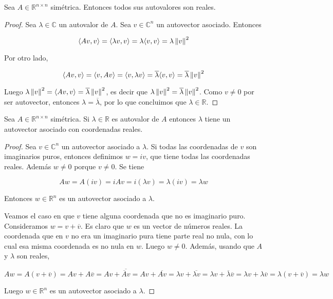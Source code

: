 \begin{lema}
\label{lema:autovreales}
Sea $A \in \mathbb{R}^{n \times n}$ simétrica. Entonces todos sus autovalores son reales.

\begin{proof}
Sea $\lambda \in \mathbb{C}$ un autovalor de $A$. Sea $v \in \mathbb{C}^n$ un autovector asociado. Entonces

\[\langle Av, v \rangle = \langle \lambda v, v \rangle = \lambda \langle v, v \rangle = \lambda \left\lVert v\right\rVert^2\]

Por otro lado,

\[\langle Av, v \rangle = \langle v, Av \rangle = \langle v, \lambda v \rangle = \overline{\lambda}\langle v, v \rangle = \overline{\lambda} \left\lVert v\right\rVert^2\]

Luego $\lambda \left\lVert v\right\rVert^2 = \langle Av, v \rangle = \overline{\lambda} \left\lVert v\right\rVert^2$, es decir que $\lambda \left\lVert v\right\rVert^2 = \overline{\lambda} \left\lVert v\right\rVert^2$. Como $v \neq 0$ por ser autovector, entonces $\lambda = \overline{\lambda}$, por lo que concluimos que $\lambda \in \mathbb{R}$.
\end{proof}
\end{lema}

\begin{lema}
Sea $A \in \mathbb{R}^{n \times n}$ simétrica. Si $\lambda \in \mathbb{R}$ es autovalor de $A$ entonces $\lambda$ tiene un autovector asociado con coordenadas reales.

\begin{proof}
Sea $v \in \mathbb{C}^n$ un autovector asociado a $\lambda$. Si todas las coordenadas de $v$ son imaginarios puros, entonces definimos $w = iv$, que tiene todas las coordenadas reales. Además $w \neq 0$ porque $v \neq 0$. Se tiene

\[Aw = A(iv) = iAv = i(\lambda v) = \lambda (iv) = \lambda w\]

Entonces $w \in \mathbb{R}^n$ es un autovector asociado a $\lambda$.

Veamos el caso en que $v$ tiene alguna coordenada que no es imaginario puro. Consideramos $w = v + \overline{v}$. Es claro que $w$ es un vector de números reales. La coordenada que en $v$ no era un imaginario pura tiene parte real no nula, con lo cual esa misma coordenada es no nula en $w$. Luego $w \neq 0$. Además, usando que $A$ y $\lambda$ son reales,

\[Aw = A(v + \overline{v}) = Av + A\overline{v} = Av + \overline{\overline{A}v} = Av + \overline{Av} = \lambda v + \overline{\lambda v} = \lambda v + \overline{\lambda} \overline{v} = \lambda v + \lambda \overline{v} = \lambda(v + \overline{v}) = \lambda w \]

Luego $w \in \mathbb{R}^n$ es un autovector asociado a $\lambda$.
\end{proof}
\end{lema}

